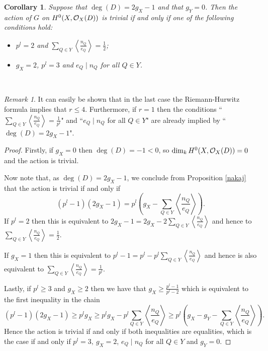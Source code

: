 \documentclass[draft, 11pt]{article} %
\theoremstyle{plain}
\newtheorem{cor}[defn]{Corollary}
\theoremstyle{remark}
\newtheorem*{rem}{Remark}
\newcommand{\cO}{{\cal O}}
\begin{document}
  \begin{cor}
    Suppose that $\deg(D)= 2g_X-1$ and that $g_Y=0$. Then the action of $G$ on $H^0(X,\cO_X(D))$ is trivial if and only if one of the following conditions hold:
      \begin{itemize}
	\item  $p^l=2$ and $\sum_{Q\in Y}\left\langle\frac{n_Q}{e_Q}\right\rangle=\frac{1}{2}$;
	\item  $g_X=2$, $p^l=3$ and $e_Q\mid n_Q$ for all $Q\in Y$.
      \end{itemize}
  \end{cor}~


  \begin{rem}
    It can easily be shown that in the last case the Riemann-Hurwitz formula implies that $r\leq 4$. 
    Furthermore, if $r=1$ then the conditions ``$\sum_{Q\in Y}\left\langle\frac{n_Q}{e_Q}\right\rangle=\frac{1}{p^l}$" and ``$e_Q\mid n_Q$ for all $Q\in Y$" are already implied by ``$\deg(D)=2g_X-1$".
  \end{rem}

  \begin{proof}
    Firstly, if $g_X=0$ then $\deg(D)=-1<0$, so $\dim_kH^0(X,\cO_X(D))=0$ and the action is trivial.

    Now note that, as $\deg(D)=2g_X-1$, we conclude from Proposition \ref{nakaj} that the action is trivial if and only if 
      \begin{equation*}
	(p^l-1)(2g_X-1)=p^l\left(g_X-\sum_{Q\in Y}\left\langle\frac{n_Q}{e_Q}\right\rangle\right).
      \end{equation*}
    If $p^l=2$ then this is equivalent to $2g_X-1=2g_X-2\sum_{Q\in Y}\left\langle\frac{n_Q}{e_Q}\right\rangle$ and hence to $\sum_{Q\in Y}\left\langle\frac{n_Q}{e_Q}\right\rangle=\frac{1}{2}$.

    If $g_X=1$ then this is equivalent to $p^l-1=p^l-p^l\sum_{Q\in Y}\left\langle\frac{n_Q}{e_Q}\right\rangle$ and hence is also equivalent to $\sum_{Q\in Y}\left\langle\frac{n_Q}{e_Q}\right\rangle=\frac{1}{p^l}$.

    Lastly, if $p^l\geq 3$ and $g_X\geq 2$ then we have that $g_X\geq \frac{p^l-1}{p^l-2}$ which is equivalent to the first inequality in the chain
      \begin{equation*}
	(p^l-1)(2g_X-1)\geq p^lg_X\geq p^lg_X-p^l\sum_{Q\in Y}\left\langle\frac{n_Q}{e_Q}\right\rangle \geq p^l\left( g_X - g_Y -\sum_{Q\in Y} \left\langle \frac{n_Q}{e_Q} \right\rangle \right).
      \end{equation*}
    Hence the action is trivial if and only if both inequalities are equalities, which is the case if and only if $p^l=3,\ g_X=2$, $e_Q\mid n_Q$ for all $Q\in Y$ and $g_Y = 0$.
  \end{proof}
\end{document}
